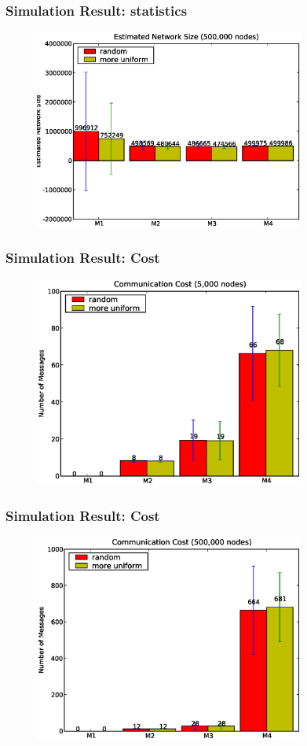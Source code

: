 \documentclass[red]{beamer}
\begin{document}
\begin{frame}
\frametitle{Simulation Result: statistics}
\begin{figure}
\centering
\includegraphics[width=3.5in]{figs/size500k}
\end{figure}
\end{frame}
\begin{frame}
\frametitle{Simulation Result: Cost}
\begin{figure}
\centering
\includegraphics[width=3.5in]{figs/cost5k}
\end{figure}
\end{frame}
\begin{frame}
\frametitle{Simulation Result: Cost}
\begin{figure}
\centering
\includegraphics[width=3.5in]{figs/cost500k}
\end{figure}
\end{frame}
\end{document}
